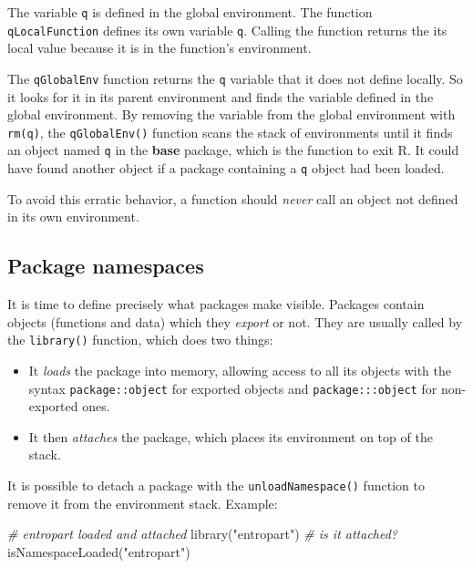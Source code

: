 \documentclass[
  12pt,
  american,
  a4paper,
  extrafontsizes,onecolumn,openright
  ]{memoir}
\newenvironment{Shaded}{\begin{snugshade}}{\end{snugshade}}
\newcommand{\CommentTok}[1]{\textcolor[rgb]{0.56,0.35,0.01}{\textit{#1}}}
\newcommand{\FunctionTok}[1]{\textcolor[rgb]{0.00,0.00,0.00}{#1}}
\newcommand{\NormalTok}[1]{#1}
\newcommand{\StringTok}[1]{\textcolor[rgb]{0.31,0.60,0.02}{#1}}
\providecommand{\tightlist}{%
  \setlength{\itemsep}{0pt}\setlength{\parskip}{0pt}}
\begin{document}
The variable \texttt{q} is defined in the global environment.
The function \texttt{qLocalFunction} defines its own variable \texttt{q}.
Calling the function returns the its local value because it is in the function's environment.

The \texttt{qGlobalEnv} function returns the \texttt{q} variable that it does not define locally.
So it looks for it in its parent environment and finds the variable defined in the global environment.
By removing the variable from the global environment with \texttt{rm(q)}, the \texttt{qGlobalEnv()} function scans the stack of environments until it finds an object named \texttt{q} in the \textbf{base} package, which is the function to exit R.
It could have found another object if a package containing a \texttt{q} object had been loaded.

To avoid this erratic behavior, a function should \emph{never} call an object not defined in its own environment.

\hypertarget{package-namespaces}{%
\subsection{Package namespaces}\label{package-namespaces}}

It is time to define precisely what packages make visible.
Packages contain objects (functions and data) which they \emph{export} or not.
They are usually called by the \texttt{library()} function, which does two things:

\begin{itemize}
\tightlist
\item
  It \emph{loads} the package into memory, allowing access to all its objects with the syntax \texttt{package::object} for exported objects and \texttt{package:::object} for non-exported ones.
\item
  It then \emph{attaches} the package, which places its environment on top of the stack.
\end{itemize}

It is possible to detach a package with the \texttt{unloadNamespace()} function to remove it from the environment stack.
Example:

\scriptsize

\begin{Shaded}
\begin{Highlighting}[]
\CommentTok{\# entropart loaded and attached}
\FunctionTok{library}\NormalTok{(}\StringTok{"entropart"}\NormalTok{)}
\CommentTok{\# is it attached?}
\FunctionTok{isNamespaceLoaded}\NormalTok{(}\StringTok{"entropart"}\NormalTok{)}
\end{Highlighting}
\end{Shaded}
\end{document}
